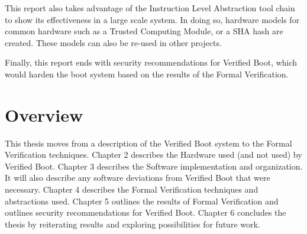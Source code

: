 This report also takes advantage of the Instruction Level Abstraction tool chain
to show its effectiveness in a large scale system.
In doing so, hardware models for common hardware such as a Trusted Computing
Module, or a SHA hash are created.
These models can also be re-used in other projects.

Finally, this report ends with security recommendations for Verified Boot, which
would harden the boot system based on the results of the Formal Verification.

\section{Overview}

This thesis moves from a description of the Verified Boot system to the Formal
Verification techniques.
Chapter 2 describes the Hardware used (and not used) by Verified Boot.
Chapter 3 describes the Software implementation and organization.
It will also describe any software deviations from Verified Boot that were
necessary.
Chapter 4 describes the Formal Verification techniques and abstractions used.
Chapter 5 outlines the results of Formal Verification and outlines security
recommendations for Verified Boot.
Chapter 6 concludes the thesis by reiterating results and exploring
possibilities for future work.
